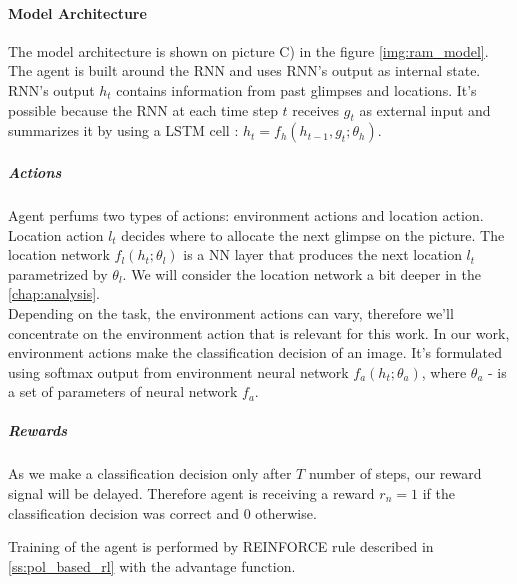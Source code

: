 \paragraph{Model Architecture} The model architecture is shown
on picture C) in the figure \ref{img:ram_model}. The agent is built around
the RNN and uses RNN's output as internal state. RNN's output $h_t$ contains
information from past glimpses and locations. It's possible
because the RNN at each time step $t$ receives $g_t$ as external input and
summarizes it by using a LSTM cell : $h_t = f_h(h_{t-1}, g_t; \theta_h)$.

\subparagraph{Actions} Agent perfums two types of actions: environment actions
and location action. Location action $l_t$ decides where to allocate the next glimpse
on the picture. The location network $f_l(h_t; \theta_l)$ is a NN layer
that produces the next location $l_t$ parametrized by $\theta_l$. We will consider the
location network a bit deeper in the \autoref{chap:analysis}. \\
Depending on the task, the environment actions can vary, therefore
we'll concentrate on the environment action that is relevant for this work.
In our work, environment actions make the classification decision of an image.
It's formulated using softmax output from environment neural network
 $f_a(h_t; \theta_a)$, where $\theta_a$ - is a set of parameters of neural network $f_a$.

\subparagraph{Rewards} As we make a classification decision only after $T$
number of steps, our reward signal will be delayed. Therefore agent is receiving
a reward $r_n = 1$ if the classification decision was correct and $0$ otherwise.


Training of the agent is performed by REINFORCE rule
described in \autoref{ss:pol_based_rl} with the advantage function.











